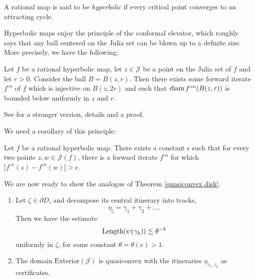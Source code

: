 A rational map is said to be \emph{hyperbolic} if every critical point converges to an attracting cycle.

Hyperbolic maps enjoy the principle of the conformal elevator, which roughly says that any ball centered on the Julia set can be blown up to a definite size. More precisely, we have the following:

\begin{proposition} \label{elevator}
	Let $f$ be a rational hyperbolic map, let $z\in \mathcal J$ be a point on the Julia set of $f$ and let $r>0$. Consider the ball $B=B(z,r)$. Then there exists some forward iterate $f^{\circ n}$ of $f$ which is injective on $B(z,2r)$ and such that
	$\operatorname{diam} {f^{\circ n}(B(z,r))}$ is bounded below uniformly in $z$ and $r$. 
\end{proposition}

See \cite{BLM16} for a stronger version, details and a proof.

We need a corollary of this principle:

\begin{corollary} \label{elevator for points on julia}
	Let $f$ be a rational hyperbolic map. There exists a constant $\epsilon$ such that for every two points $z,w\in\mathcal{J}(f)$, there is a forward iterate
$f^{\circ n}$ for which $\left|f^{\circ n}(z)-f^{\circ n}(w)\right|>\epsilon$.	
\end{corollary}

\begin{comment}
\begin{proof}
	Apply proposition \ref{elevator} to a ball centered on the Julia set which contains $z,w$ on its boundary at roughly antipodal points. After blowing up we get points $f^{\circ n}(z),f^{\circ n}(w)$ which are a definite distance apart by Koebe's distortion theorem. %
\end{proof}
\end{comment}

We are now ready to show the analogue of Theorem \ref{quasiconvex disk}.
\begin{theorem} 
\begin{enumerate}[label=(\roman*)]


\item Let $\zeta\in\partial{D}$, and decompose its central itinerary into tracks, 
\begin{equation*}
\eta_\zeta = \gamma _1 +\gamma_2 +\ldots.
\end{equation*}
Then we have the estimate
\begin{equation*}
\operatorname{Length}(\psi(\gamma_{k}))\lesssim\theta^{-k}
\end{equation*}
uniformly in
$\zeta$, for some constant $\theta=\theta(c)>1$.

\item The domain $\mathrm{Exterior}(\mathcal{J})$ is quasiconvex with the itineraries $\eta_{z_1,z_2}$ as certificates.
	\end{enumerate}
\end{theorem}

